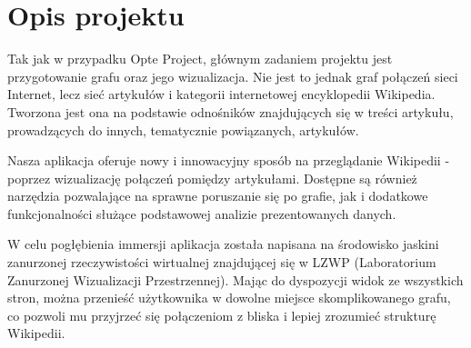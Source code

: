\section{Opis projektu}
Tak jak w przypadku Opte Project, głównym zadaniem projektu jest przygotowanie grafu oraz jego wizualizacja. Nie jest to jednak graf połączeń sieci Internet, lecz sieć artykułów i kategorii internetowej encyklopedii Wikipedia. Tworzona jest ona na podstawie odnośników znajdujących się w treści artykułu, prowadzących do innych, tematycznie powiązanych, artykułów.

Nasza aplikacja oferuje nowy i innowacyjny sposób na przeglądanie Wikipedii - poprzez wizualizację połączeń pomiędzy artykułami. Dostępne są również narzędzia pozwalające na sprawne poruszanie się po grafie, jak i dodatkowe funkcjonalności służące podstawowej analizie prezentowanych danych.

W celu pogłębienia immersji aplikacja została napisana na środowisko jaskini zanurzonej rzeczywistości wirtualnej znajdującej się w LZWP (Laboratorium Zanurzonej Wizualizacji Przestrzennej). Mając do dyspozycji widok ze wszystkich stron, można przenieść użytkownika w dowolne miejsce skomplikowanego grafu, co pozwoli mu przyjrzeć się połączeniom z bliska i lepiej zrozumieć strukturę Wikipedii.
